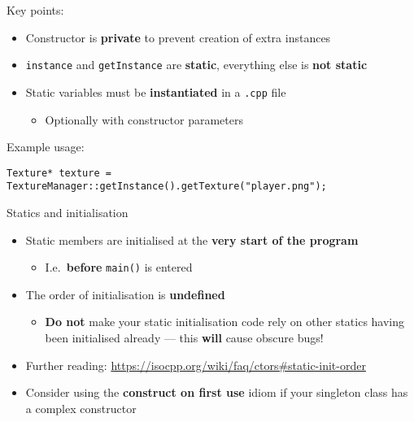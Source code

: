\begin{frame}[fragile]
    Key points: \pause
    \begin{itemize}
        \item Constructor is \textbf{private} to prevent creation of extra instances \pause
        \item \lstinline{instance} and \lstinline{getInstance} are \textbf{static}, everything else is \textbf{not static} \pause
        \item Static variables must be \textbf{instantiated} in a \texttt{.cpp} file
            \begin{itemize}
                \item Optionally with constructor parameters
            \end{itemize} \pause
    \end{itemize}
    Example usage:
    \begin{lstlisting}
Texture* texture = TextureManager::getInstance().getTexture("player.png");
    \end{lstlisting}
\end{frame}

\begin{frame}[fragile]{Statics and initialisation}
    \begin{itemize}
        \item Static members are initialised at the \textbf{very start of the program} \pause
            \begin{itemize}
                \item I.e.\ \textbf{before} \lstinline{main()} is entered \pause
            \end{itemize}
        \item The order of initialisation is \textbf{undefined} \pause
            \begin{itemize}
                \item \textbf{Do not} make your static initialisation code rely on other statics having been initialised already ---
                    this \textbf{will} cause obscure bugs! \pause
            \end{itemize}
        \item Further reading: \url{https://isocpp.org/wiki/faq/ctors#static-init-order} \pause
        \item Consider using the \textbf{construct on first use} idiom if your singleton class
            has a complex constructor
    \end{itemize}
\end{frame}

